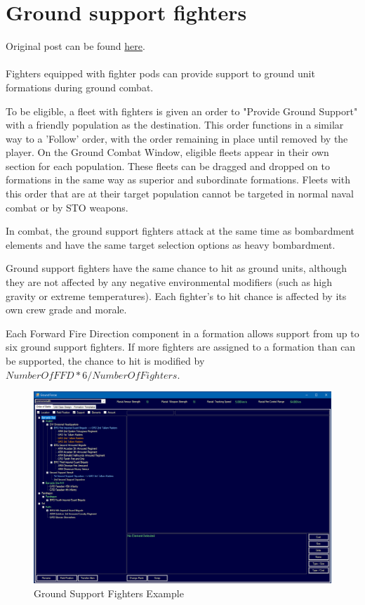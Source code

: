 \documentclass[../../Aurora C# unofficial manual.tex]{subfiles}
\begin{document}
	\section{Ground support fighters}
	Original post can be found
	\href{http://aurora2.pentarch.org/index.php?topic=8495.msg109886#msg109886}{here}.
	\\\\
	
	Fighters equipped with fighter pods can provide support to ground unit formations during ground combat.
	
	To be eligible, a fleet with fighters is given an order to "Provide Ground Support" with a friendly population as the destination. This order functions in a similar way to a 'Follow' order, with the order remaining in place until removed by the player. On the Ground Combat Window, eligible fleets appear in their own section for each population. These fleets can be dragged and dropped on to formations in the same way as superior and subordinate formations. Fleets with this order that are at their target population cannot be targeted in normal naval combat or by STO weapons.
	
	In combat, the ground support fighters attack at the same time as bombardment elements and have the same target selection options as heavy bombardment.
	
	Ground support fighters have the same chance to hit as ground units, although they are not affected by any negative environmental modifiers (such as high gravity or extreme temperatures). Each fighter's to hit chance is affected by its own crew grade and morale.
	
	Each Forward Fire Direction component in a formation allows support from up to six ground support fighters. If more fighters are assigned to a formation than can be supported, the chance to hit is modified by \( Number Of FFD * 6 / Number Of Fighters \).
	\begin{figure}[H]
		\centering
		\includegraphics[width=0.95\linewidth]{images/GroundSupportFighters}
		\caption[Ground Support Fighters]{Ground Support Fighters Example}
		\label{fig:groundsupportfighters}
	\end{figure}
\end{document}
